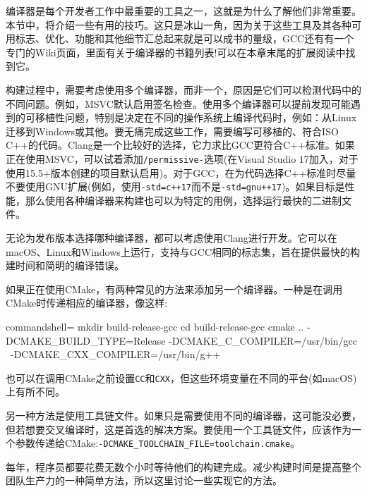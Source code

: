 
编译器是每个开发者工作中最重要的工具之一，这就是为什么了解他们非常重要。本节中，将介绍一些有用的技巧。这只是冰山一角，因为关于这些工具及其各种可用标志、优化、功能和其他细节汇总起来就是可以成书的量级，GCC还有有一个专门的Wiki页面，里面有关于编译器的书籍列表!可以在本章末尾的扩展阅读中找到它。


构建过程中，需要考虑使用多个编译器，而非一个，原因是它们可以检测代码中的不同问题。例如，MSVC默认启用签名检查。使用多个编译器可以提前发现可能遇到的可移植性问题，特别是决定在不同的操作系统上编译代码时，例如：从Linux迁移到Windows或其他。要无痛完成这些工作，需要编写可移植的、符合ISO C++的代码。Clang是一个比较好的选择，它力求比GCC更符合C++标准。如果正在使用MSVC，可以试着添加\texttt{/permissive-}选项(在Visual Studio 17加入，对于使用15.5+版本创建的项目默认启用)。对于GCC，在为代码选择C++标准时尽量不要使用GNU扩展(例如，使用\texttt{-std=c++17}而不是\texttt{-std=gnu++17})。如果目标是性能，那么使用各种编译器来构建也可以为特定的用例，选择运行最快的二进制文件。

\begin{tcolorbox}[colback=webgreen!5!white,colframe=webgreen!75!black, title=TIP]
\hspace*{0.7cm}无论为发布版本选择哪种编译器，都可以考虑使用Clang进行开发。它可以在macOS、Linux和Windows上运行，支持与GCC相同的标志集，旨在提供最快的构建时间和简明的编译错误。
\end{tcolorbox}

如果正在使用CMake，有两种常见的方法来添加另一个编译器。一种是在调用CMake时传递相应的编译器，像这样:

\begin{tcblisting}{commandshell={}}
mkdir build-release-gcc
cd build-release-gcc
cmake .. -DCMAKE_BUILD_TYPE=Release -DCMAKE_C_COMPILER=/usr/bin/gcc \
  -DCMAKE_CXX_COMPILER=/usr/bin/g++
\end{tcblisting}

也可以在调用CMake之前设置\texttt{CC}和\texttt{CXX}，但这些环境变量在不同的平台(如macOS)上有所不同。

另一种方法是使用工具链文件。如果只是需要使用不同的编译器，这可能没必要，但若想要交叉编译时，这是首选的解决方案。要使用一个工具链文件，应该作为一个参数传递给CMake:\texttt{-DCMAKE\_TOOLCHAIN\_FILE=toolchain.cmake}。


每年，程序员都要花费无数个小时等待他们的构建完成。减少构建时间是提高整个团队生产力的一种简单方法，所以这里讨论一些实现它的方法。


